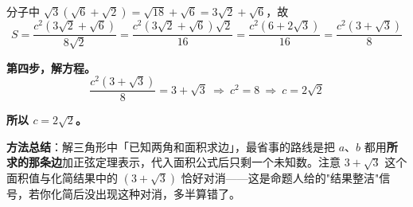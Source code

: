\begin{answer}
分子中 $\sqrt3\left(\sqrt6+\sqrt2\right)=\sqrt{18}+\sqrt6=3\sqrt2+\sqrt6$，故
\nopagebreak[4]
\[S=\frac{c^{2}\left(3\sqrt2+\sqrt6\right)}{8\sqrt2}=\frac{c^{2}\left(3\sqrt2+\sqrt6\right)\sqrt2}{16}=\frac{c^{2}\left(6+2\sqrt3\right)}{16}=\frac{c^{2}\left(3+\sqrt3\right)}8\]

\textbf{第四步，解方程。}
\nopagebreak[4]
\[\frac{c^{2}\left(3+\sqrt3\right)}8=3+\sqrt3\ \Longrightarrow\ c^{2}=8\ \Longrightarrow\ c=2\sqrt2\]

\textbf{所以 $c=2\sqrt2$。}

\begin{gktip}
\textbf{方法总结}：解三角形中「已知两角和面积求边」，最省事的路线是把 $a$、$b$ 都用\textbf{所求的那条边}加正弦定理表示，代入面积公式后只剩一个未知数。注意 $3+\sqrt3$ 这个面积值与化简结果中的 $\left(3+\sqrt3\right)$ 恰好对消——这是命题人给的"结果整洁"信号，若你化简后没出现这种对消，多半算错了。
\end{gktip}



\par\medskip

\end{answer}
